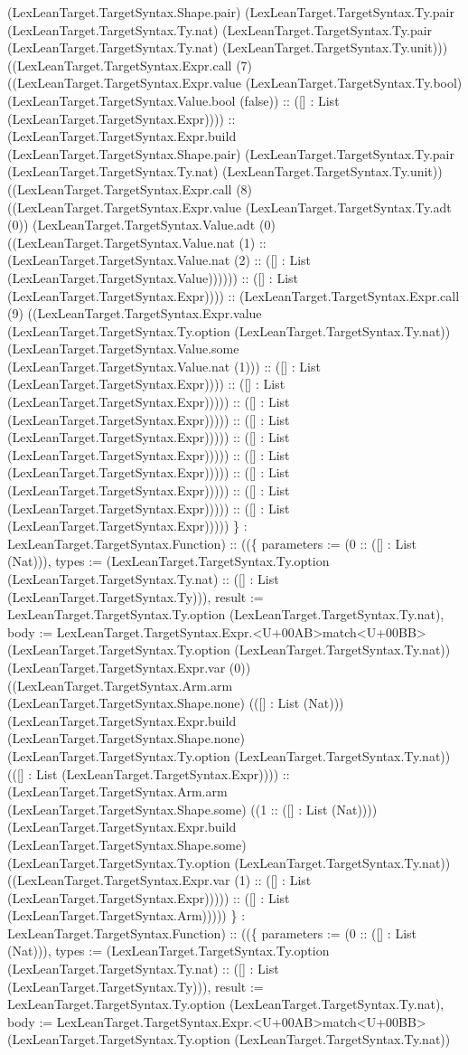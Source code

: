 \documentclass[11pt]{article}
\begin{document}
(LexLeanTarget.TargetSyntax.Shape.pair) (LexLeanTarget.TargetSyntax.Ty.pair (LexLeanTarget.TargetSyntax.Ty.nat) (LexLeanTarget.TargetSyntax.Ty.pair (LexLeanTarget.TargetSyntax.Ty.nat) (LexLeanTarget.TargetSyntax.Ty.unit))) ((LexLeanTarget.TargetSyntax.Expr.call (7) ((LexLeanTarget.TargetSyntax.Expr.value (LexLeanTarget.TargetSyntax.Ty.bool) (LexLeanTarget.TargetSyntax.Value.bool (false)) :: ([] : List (LexLeanTarget.TargetSyntax.Expr)))) :: (LexLeanTarget.TargetSyntax.Expr.build (LexLeanTarget.TargetSyntax.Shape.pair) (LexLeanTarget.TargetSyntax.Ty.pair (LexLeanTarget.TargetSyntax.Ty.nat) (LexLeanTarget.TargetSyntax.Ty.unit)) ((LexLeanTarget.TargetSyntax.Expr.call (8) ((LexLeanTarget.TargetSyntax.Expr.value (LexLeanTarget.TargetSyntax.Ty.adt (0)) (LexLeanTarget.TargetSyntax.Value.adt (0) ((LexLeanTarget.TargetSyntax.Value.nat (1) :: (LexLeanTarget.TargetSyntax.Value.nat (2) :: ([] : List (LexLeanTarget.TargetSyntax.Value)))))) :: ([] : List (LexLeanTarget.TargetSyntax.Expr)))) :: (LexLeanTarget.TargetSyntax.Expr.call (9) ((LexLeanTarget.TargetSyntax.Expr.value (LexLeanTarget.TargetSyntax.Ty.option (LexLeanTarget.TargetSyntax.Ty.nat)) (LexLeanTarget.TargetSyntax.Value.some (LexLeanTarget.TargetSyntax.Value.nat (1))) :: ([] : List (LexLeanTarget.TargetSyntax.Expr)))) :: ([] : List (LexLeanTarget.TargetSyntax.Expr))))) :: ([] : List (LexLeanTarget.TargetSyntax.Expr))))) :: ([] : List (LexLeanTarget.TargetSyntax.Expr))))) :: ([] : List (LexLeanTarget.TargetSyntax.Expr))))) :: ([] : List (LexLeanTarget.TargetSyntax.Expr))))) :: ([] : List (LexLeanTarget.TargetSyntax.Expr))))) :: ([] : List (LexLeanTarget.TargetSyntax.Expr))))) :: ([] : List (LexLeanTarget.TargetSyntax.Expr))))) \} : LexLeanTarget.TargetSyntax.Function) :: ((\{ parameters := (0 :: ([] : List (Nat))), types := (LexLeanTarget.TargetSyntax.Ty.option (LexLeanTarget.TargetSyntax.Ty.nat) :: ([] : List (LexLeanTarget.TargetSyntax.Ty))), result := LexLeanTarget.TargetSyntax.Ty.option (LexLeanTarget.TargetSyntax.Ty.nat), body := LexLeanTarget.TargetSyntax.Expr.<U+00AB>match<U+00BB> (LexLeanTarget.TargetSyntax.Ty.option (LexLeanTarget.TargetSyntax.Ty.nat)) (LexLeanTarget.TargetSyntax.Expr.var (0)) ((LexLeanTarget.TargetSyntax.Arm.arm (LexLeanTarget.TargetSyntax.Shape.none) (([] : List (Nat))) (LexLeanTarget.TargetSyntax.Expr.build (LexLeanTarget.TargetSyntax.Shape.none) (LexLeanTarget.TargetSyntax.Ty.option (LexLeanTarget.TargetSyntax.Ty.nat)) (([] : List (LexLeanTarget.TargetSyntax.Expr)))) :: (LexLeanTarget.TargetSyntax.Arm.arm (LexLeanTarget.TargetSyntax.Shape.some) ((1 :: ([] : List (Nat)))) (LexLeanTarget.TargetSyntax.Expr.build (LexLeanTarget.TargetSyntax.Shape.some) (LexLeanTarget.TargetSyntax.Ty.option (LexLeanTarget.TargetSyntax.Ty.nat)) ((LexLeanTarget.TargetSyntax.Expr.var (1) :: ([] : List (LexLeanTarget.TargetSyntax.Expr))))) :: ([] : List (LexLeanTarget.TargetSyntax.Arm))))) \} : LexLeanTarget.TargetSyntax.Function) :: ((\{ parameters := (0 :: ([] : List (Nat))), types := (LexLeanTarget.TargetSyntax.Ty.option (LexLeanTarget.TargetSyntax.Ty.nat) :: ([] : List (LexLeanTarget.TargetSyntax.Ty))), result := LexLeanTarget.TargetSyntax.Ty.option (LexLeanTarget.TargetSyntax.Ty.nat), body := LexLeanTarget.TargetSyntax.Expr.<U+00AB>match<U+00BB> (LexLeanTarget.TargetSyntax.Ty.option (LexLeanTarget.TargetSyntax.Ty.nat)) 
\end{document}
